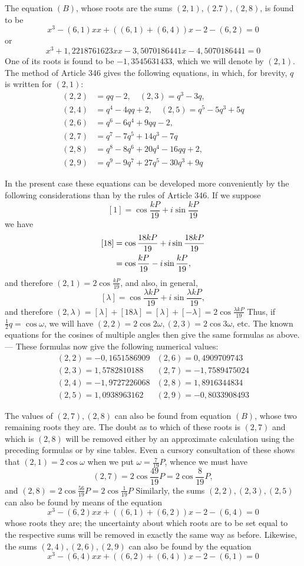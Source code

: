 The equation \((B)\), whose roots are the sums \((2,1),\allowbreak (2.7),\allowbreak (2,8)\), is found to be \[x^3-(6,1)xx+((6,1)+(6,4))x-2-(6,2)=0\] or \[x^3+1{,}2218761623xx-3{,}5070186441x-4{,}5070186441=0\] One of its roots is found to be \(-1{,}3545631433\), which we will denote by \((2,1)\). The method of Article 346 gives the following equations, in which, for brevity, \(q\) is written for \((2,1)\): \[\begin{aligned}
(2,2)&=qq-2,\quad (2,3)=q^3-3q,\\
(2,4)&=q^4-4qq+2,\quad (2,5)=q^5-5q^3+5q\\
(2,6)&=q^6-6q^4+9qq-2,\\
(2,7)&=q^7-7q^5+14q^3-7q\\
(2,8)&=q^8-8q^6+20q^4-16qq+2,\\
(2,9)&=q^9-9q^7+27q^5-30q^3+9q
\end{aligned}\]

In the present case these equations can be developed more conveniently by the following considerations than by the rules of Article 346. If we suppose \[[1]=\cos\frac{kP}{19}+i\sin\frac{kP}{19}\] we have \[\begin{aligned}
\relax[18]&=\cos\frac{18kP}{19}+i\sin\frac{18kP}{19}\\
&=\cos\frac{kP}{19}-i\sin\frac{kP}{19},
\end{aligned}\] and therefore \((2,1)=2\cos\frac{kP}{19}\), and also, in general, \[[\lambda]=\cos\frac{\lambda kP}{19}+i\sin\frac{\lambda kP}{19},\] and therefore \((2,\lambda)=[\lambda]+[18\lambda]=[\lambda]+[-\lambda]=2\cos\frac{\lambda kP}{19}\) Thus, if \(\frac12q=\cos\omega\), we will have \((2,2)=2\cos2\omega,\allowbreak (2,3)=2\cos3\omega\), etc. The known equations for the cosines of multiple angles then give the same formulas as above. — These formulas now give the following numerical values: \[\begin{array}{r|r}(2,2)=-0{,}1651586909&(2,6)=0{,}4909709743\\(2,3)=1{,}5782810188&(2,7)=-1{,}7589475024\\(2,4)=-1{,}9727226068&(2,8)=1{,}8916344834\\(2,5)=1{,}0938963162&(2,9)=-0{,}8033908493\end{array}\]

The values of \((2,7),\allowbreak (2,8)\) can also be found from equation \((B)\), whose two remaining roots they are. The doubt as to which of these roots is \((2,7)\) and which is \((2,8)\) will be removed either by an approximate calculation using the preceding formulas or by sine tables. Even a cursory consultation of these shows that \((2,1)=2\cos\omega\) when we put \(\omega=\frac7{19}P\), whence we must have \[(2,7)=2\cos\frac{49}{19}P=2\cos\frac8{19}P,\] and \((2,8)=2\cos\frac{56}{19}P=2\cos\frac1{19}P\) Similarly, the sums \((2,2),\allowbreak (2,3),\allowbreak (2,5)\) can also be found by means of the equation \[x^3-(6,2)xx+((6,1)+(6,2))x-2-(6,4)=0\] whose roots they are; the uncertainty about which roots are to be set equal to the respective sums will be removed in exactly the same way as before. Likewise, the sums \((2,4),\allowbreak (2,6),\allowbreak (2,9)\) can also be found by the equation \[x^3-(6,4)xx+((6,2)+(6,4))x-2-(6,1)=0\]

